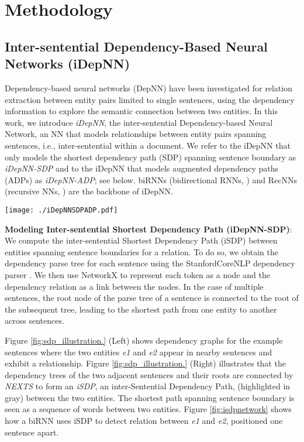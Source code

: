 \documentclass[letterpaper]{article} \usepackage{aaai19}  \usepackage{times}  \usepackage{helvet}  \usepackage{courier}  \usepackage{url}  \usepackage{graphicx}
\def\citet#1{\citeauthor{#1} \shortcite{#1}}
\begin{document}
\section{Methodology}
\label{methodology}

\subsection{Inter-sentential Dependency-Based Neural Networks (iDepNN)}
Dependency-based neural networks
(DepNN) \cite{bunescu2005shortest,liu2015dependency} have
been investigated for relation extraction between entity
pairs limited to single sentences, using the dependency
information to explore the semantic connection between two
entities.  In this work, we
introduce
\emph{iDepNN}, the
inter-sentential Dependency-based Neural
Network, an NN that models
relationships between entity pairs spanning sentences, i.e.,
inter-sentential within a document. 
We refer to the iDepNN that only
models the shortest dependency path (SDP) spanning sentence
boundary  as \emph{iDepNN-SDP} and to the iDepNN
that models 
augmented dependency paths (ADPs)  as \emph{iDepNN-ADP}; see below.
biRNNs (bidirectional
RNNs, \citet{schuster1997bidirectional}) and
RecNNs (recursive NNs, \citet{socher2012semantic}) are the
backbone of iDepNN.

\begin{figure*}[t]
{
  \centering
   \texttt{[image: ./iDepNNSDPADP.pdf]}
    \caption{Inter-sentential Dependency-based Neural Network variants: iDepNN-SDP and iDepNN-ADP}
    \label{fig:isdpnetwork}
}
\end{figure*}

{\bf Modeling Inter-sentential Shortest Dependency Path (iDepNN-SDP)}:  
We compute the inter-sentential Shortest Dependency Path (iSDP) between entities spanning sentence boundaries for a relation. 
To do so, we obtain the dependency parse tree for each sentence using the StanfordCoreNLP dependency parser \cite{manning2014stanford}. 
We then use NetworkX \cite{hagberg2008exploring} to represent each token as a node and the dependency relation as a link between the nodes. 
In the case of multiple sentences, the root node of the parse tree of a sentence is connected to the root of the subsequent tree, leading to the shortest path from one entity  to another across sentences.


Figure \ref{fig:sdp_illustration.} (Left) shows dependency
graphs for the example sentences where the two
entities \emph{e1} and \emph{e2} appear in nearby sentences
and exhibit a relationship.
Figure \ref{fig:sdp_illustration.} (Right) illustrates that
the dependency trees of the two adjacent sentences and their
roots are connected by {\it NEXTS} to form an \emph{iSDP},
an inter-Sentential Dependency Path, (highlighted in gray)
between the two entities.  The shortest path spanning
sentence boundary is seen as a sequence of words between two
entities. Figure \ref{fig:isdpnetwork} shows how a
biRNN
\cite{schuster1997bidirectional,vu2016bi} uses
iSDP to detect relation between \emph{e1}
and \emph{e2}, positioned one sentence apart.
\end{document}

